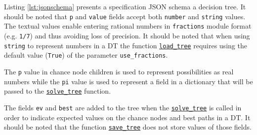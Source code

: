 \documentclass[a4paper,10pt,english]{sphinxmanual}
\begin{document}
Listing \ref{lst:jsonschema} presents a specification JSON schema a decision tree. It should be noted that \texttt{p} and \texttt{value} fields accept both \texttt{number} and \texttt{string} values. The textual values enable entering rational numbers in \texttt{fractions} module format (e.g. \texttt{1/7}) and thus avoiding loss of precision. It should be noted that when using \texttt{string} to represent numbers in a DT the function  \hyperref[index:chondro.load_tree]{\texttt{load\_tree}} requires using the default value (\texttt{True}) of the parameter \texttt{use\_fractions}.

The \texttt{p} value in chance node children is used to represent possibilities as real numbers while the \texttt{pi} value is used to represent a field in a dictionary that will be passed to the \hyperref[index:chondro.solve_tree]{\texttt{solve\_tree}}  function.

The fields \texttt{ev} and \texttt{best} are added to the tree when the \hyperref[index:chondro.solve_tree]{\texttt{solve\_tree}} is called in order to indicate expected values on the chance nodes and best paths in a DT. It should be noted that the function \hyperref[index:chondro.save_tree]{\texttt{save\_tree}} does not store values of those fields.
\end{document}
